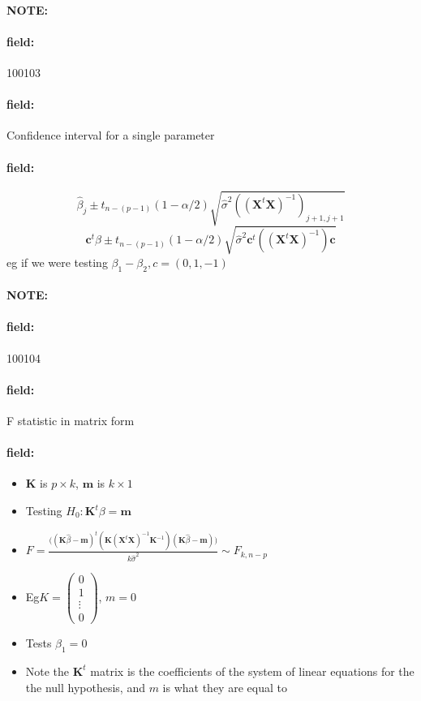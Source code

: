 \documentclass[12pt]{article}
\newenvironment{note}{\paragraph{NOTE:}}{}
\newenvironment{field}{\paragraph{field:}}{}
\begin{document}
\begin{note} \begin{field} \tiny 100103 \end{field}
 \begin{field}
  Confidence interval for a single parameter
 \end{field}
 \begin{field}
  $$ \hat{\beta}_j \pm t_{n-(p-1)}(1 - \alpha/2)\sqrt{\hat{\sigma}^2((\mathbf{X}^t \mathbf{X})^{-1})_{j+1,j+1}} $$
  $$ \mathbf{c}^t \beta \pm t_{n-(p-1)}(1 - \alpha/2)\sqrt{\hat{\sigma}^2 \mathbf{c}^t((\mathbf{X}^t \mathbf{X})^{-1})\mathbf{c}}  $$
  eg if we were testing $\beta_1 - \beta_2, c = (0,1,-1)$
 \end{field}
\end{note}





\begin{note} \begin{field} \tiny 100104 \end{field}
 \begin{field}
  F statistic in matrix form
 \end{field}
 \begin{field}
  \begin{itemize}
   \item $\mathbf{K}$  is $p\times k$, $\mathbf{m}$ is $k\times 1$
   \item Testing $H_0: \mathbf{K}^t\beta = \mathbf{m}$
   \item $F = \frac{\big((\mathbf{K}\hat{\beta} - \mathbf{m})^t (\mathbf{K}(\mathbf{X}^t \mathbf{X})^{-1}\mathbf{K}^{-1})(\mathbf{K}\hat{\beta} - \mathbf{m})\big)}{k\hat{\sigma}^2} \sim F_{k,n-p}$
   \item Eg$K = \begin{pmatrix}
           0 \\ 1 \\ \vdots \\ 0
          \end{pmatrix}$, $m = 0$
   \item Tests $\beta_1 = 0$
   \item Note the $\mathbf{K}^t$ matrix is the coefficients of the system of linear equations for the the null hypothesis, and $m$ is what they are equal to
  \end{itemize}
 \end{field}
\end{note}
\end{document}
